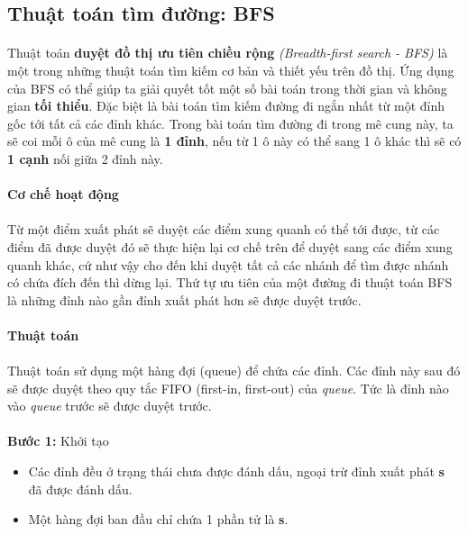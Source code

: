 
\subsection{Thuật toán tìm đường: BFS}
\paragraph{}{Thuật toán \textbf{duyệt đồ thị ưu tiên chiều rộng} \textit{(Breadth-first search - BFS)} là một trong những thuật toán tìm kiếm cơ bản và thiết yếu trên đồ thị. Ứng dụng của BFS có thể giúp ta giải quyết tốt một số bài toán trong thời gian và không gian \textbf{tối thiểu}. Đặc biệt là bài toán tìm kiếm đường đi ngắn nhất từ một đỉnh gốc tới tất cả các đỉnh khác. Trong bài toán tìm đường đi trong mê cung này, ta sẽ coi mỗi ô của mê cung là \textbf{1 đỉnh}, nếu từ 1 ô này có thể sang 1 ô khác thì sẽ có \textbf{1 cạnh} nối giữa 2 đỉnh này.}

\paragraph{Cơ chế hoạt động}
\paragraph{}{Từ một điểm xuất phát sẽ duyệt các điểm xung quanh có thể tới được, từ các điểm đã được duyệt đó sẽ thực hiện lại cơ chế trên để duyệt sang các điểm xung quanh khác, cứ như vậy cho đến khi duyệt tất cả các nhánh để tìm được nhánh có chứa đích đến thì dừng lại. Thứ tự ưu tiên của một đường đi thuật toán BFS là những đỉnh nào gần đỉnh xuất phát hơn sẽ được duyệt trước.}

\paragraph{Thuật toán}
\paragraph{}{Thuật toán sử dụng một hàng đợi (queue) để chứa các đỉnh. Các đỉnh này sau đó sẽ được duyệt theo quy tắc FIFO (first-in, first-out) của \textit{queue}. Tức là đỉnh nào vào \textit{queue} trước sẽ được duyệt trước.}

\paragraph{}{\textbf{Bước 1:} Khởi tạo}
\begin{itemize}
    \item Các đỉnh đều ở trạng thái chưa được đánh dấu, ngoại trừ đỉnh xuất phát \textbf{s} đã được đánh dấu.
    \item Một hàng đợi ban đầu chỉ chứa 1 phần tử là \textbf{s}.
\end{itemize}
